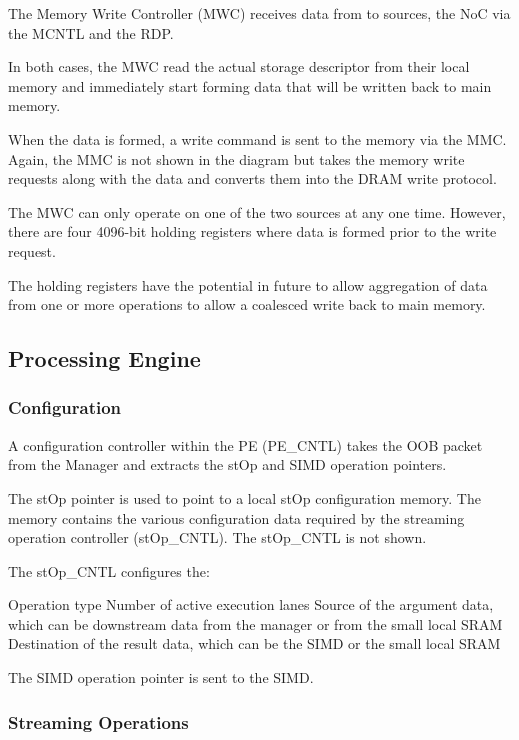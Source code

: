 \documentclass[journal]{IEEEtran}
\begin{document}
The Memory Write Controller (MWC) receives data from to sources, the NoC via the MCNTL and the RDP.

In both cases, the MWC read the actual storage descriptor from their local memory and immediately start forming data that will be written back to main memory.

When the data is formed, a write command is sent to the memory via the MMC. Again, the MMC is not shown in the diagram but takes the memory write requests along with the data and converts them into the DRAM write protocol.

The MWC can only operate on one of the two sources at any one time. However, there are four 4096-bit holding registers where data is formed prior to the write request.

The holding registers have the potential in future to allow aggregation of data from one or more operations to allow a coalesced write back to main memory.


\subsection{Processing Engine}
\label{sec:pe}

\subsubsection{Configuration}
\label{ssec:peConfiguration}

A configuration controller within the PE (PE\_CNTL) takes the OOB packet from the Manager and extracts the stOp and SIMD operation pointers.

The stOp pointer is used to point to a local stOp configuration memory. The memory contains the various configuration data required by the streaming operation controller (stOp\_CNTL). The stOp\_CNTL is not shown.

The stOp\_CNTL configures the:

\begin{outline}
    \1 Operation type
    \1 Number of active execution lanes
    \1 Source of the argument data, which can be downstream data from the manager or from the small local SRAM
    \1 Destination of the result data, which can be the SIMD or the small local SRAM
\end{outline}

The SIMD operation pointer is sent to the SIMD.

\subsubsection{Streaming Operations}
\label{ssec:stOps}
\end{document}
